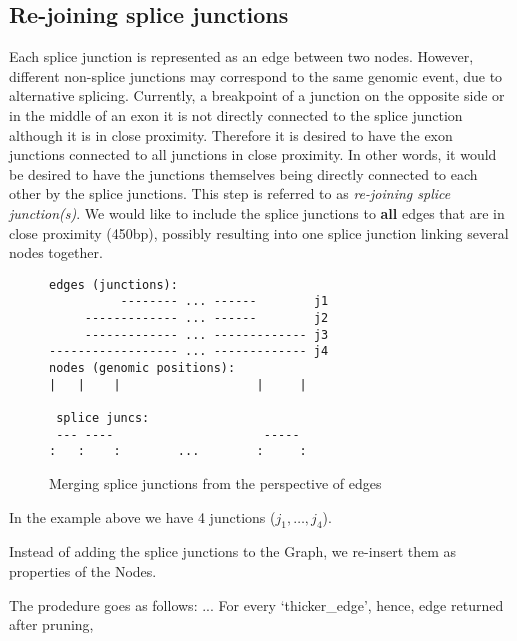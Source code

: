 \documentclass{article}
\theoremstyle{definition}
\begin{document}
\subsection{Re-joining splice junctions}
%

Each splice junction is represented as an edge between two nodes.
However, different non-splice junctions may correspond to the same genomic event, due to alternative splicing.
Currently, a breakpoint of a junction on the opposite side or in the middle of an exon it is not directly connected to the splice junction although it is in close proximity.
Therefore it is desired to have the exon junctions connected to all junctions in close proximity.
In other words, it would be desired to have the junctions themselves being directly connected to each other by the splice junctions.
This step is referred to as \textit{re-joining splice junction(s)}.
We would like to include the splice junctions to \textbf{all} edges that are in close proximity (450bp), possibly resulting into one splice junction linking several nodes together.

\begin{figure}
\begin{center}
\begin{verbatim}
edges (junctions):
          -------- ... ------        j1
     ------------- ... ------        j2
     ------------- ... ------------- j3
------------------ ... ------------- j4
nodes (genomic positions):
|   |    |                   |     |

 splice juncs:
 --- ----                     -----
:   :    :        ...        :     :
\end{verbatim}
\end{center}
\caption{Merging splice junctions from the perspective of edges}
\label{fig:merge_sj_idea}
\end{figure}
In the example above we have 4 junctions ($j_1,\ldots,j_4$).

Instead of adding the splice junctions to the Graph, we re-insert them as properties of the Nodes.

The prodedure goes as follows:
...
For every `thicker\_edge', hence, edge returned after pruning, 
\end{document}
